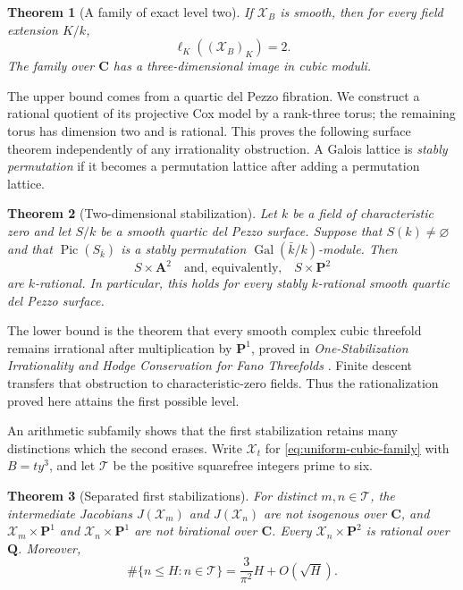 \documentclass[11pt]{article}
\newtheorem{theorem}{Theorem}[section]
\theoremstyle{remark}
\newcommand{\A}{\mathbf A}
\newcommand{\C}{\mathbf C}
\newcommand{\PP}{\mathbf P}
\newcommand{\Pic}{\operatorname{Pic}}
\begin{document}
\begin{theorem}[A family of exact level two]
\label{thm:uniform-cubic-family}
%
%
%
%
If \(\mathcal X_B\) is smooth, then for every field extension \(K/k\),
\[
 \ell_K((\mathcal X_B)_K)=2.
\]
The family over \(\C\) has a three-dimensional image in cubic moduli.
\end{theorem}

The upper bound comes from a quartic del Pezzo fibration. We construct a
rational quotient of its projective Cox model by a rank-three torus; the
remaining torus has dimension two and is rational. This proves the following
surface theorem independently of any irrationality obstruction. A Galois
lattice is \emph{stably permutation} if it becomes a permutation lattice
after adding a permutation lattice.

\begin{theorem}[Two-dimensional stabilization]
\label{thm:two-variable}
%
%
%
Let \(k\) be a field of characteristic zero and let \(S/k\) be a smooth
quartic del Pezzo surface.  Suppose that \(S(k)\ne\varnothing\) and that
\(\Pic(S_{\bar k})\) is a stably permutation
\(\operatorname{Gal}(\bar k/k)\)-module.  Then
\[
 S\times\A^2\quad\text{and, equivalently,}\quad S\times\PP^2
\]
are \(k\)-rational.  In particular, this holds for every stably
\(k\)-rational smooth quartic del Pezzo surface.
\end{theorem}


The lower bound is the theorem that every smooth complex cubic threefold
remains irrational after multiplication by \(\PP^1\), proved in
\emph{One-Stabilization Irrationality and Hodge Conservation for Fano
Threefolds} \cite[Theorem~1.1]{RuddM1}. Finite descent transfers that
obstruction to characteristic-zero fields. Thus the rationalization proved
here attains the first possible level.

An arithmetic subfamily shows that the first stabilization retains many
distinctions which the second erases. Write \(\mathcal X_t\) for
\eqref{eq:uniform-cubic-family} with \(B=ty^3\), and let
\(\mathcal T\) be the positive squarefree integers prime to six.

\begin{theorem}[Separated first stabilizations]
\label{thm:separated-pencil}
%
%
%
For distinct \(m,n\in\mathcal T\), the intermediate Jacobians
\(J(\mathcal X_m)\) and \(J(\mathcal X_n)\) are not isogenous over
\(\C\), and \(\mathcal X_m\times\PP^1\) and
\(\mathcal X_n\times\PP^1\) are not birational over \(\C\).
Every \(\mathcal X_n\times\PP^2\) is rational over \(\mathbf Q\).
Moreover,
\[
 \#\{n\leq H:n\in\mathcal T\}
 =\frac{3}{\pi^2}H+O(\sqrt H).
\]
\end{theorem}
\end{document}
